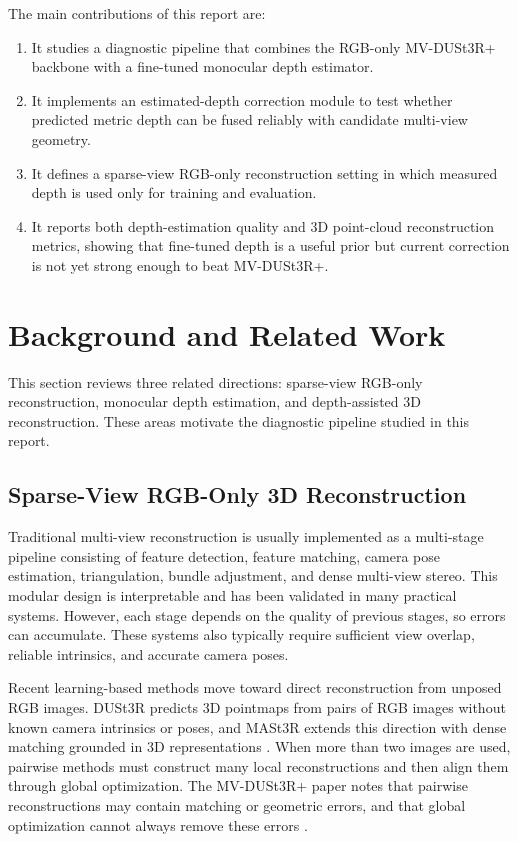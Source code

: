 \documentclass[12pt,a4paper]{article}
\newcommand{\mvdp}{MV-DUSt3R+}
\begin{document}
The main contributions of this report are:
\begin{enumerate}[leftmargin=1.2cm]
    \item It studies a diagnostic pipeline that combines the RGB-only \mvdp{} backbone with a fine-tuned monocular depth estimator.
    \item It implements an estimated-depth correction module to test whether predicted metric depth can be fused reliably with candidate multi-view geometry.
    \item It defines a sparse-view RGB-only reconstruction setting in which measured depth is used only for training and evaluation.
    \item It reports both depth-estimation quality and 3D point-cloud reconstruction metrics, showing that fine-tuned depth is a useful prior but current correction is not yet strong enough to beat \mvdp{}.
\end{enumerate}

\section{Background and Related Work}
This section reviews three related directions: sparse-view RGB-only reconstruction, monocular depth estimation, and depth-assisted 3D reconstruction. These areas motivate the diagnostic pipeline studied in this report.

\subsection{Sparse-View RGB-Only 3D Reconstruction}
Traditional multi-view reconstruction is usually implemented as a multi-stage pipeline consisting of feature detection, feature matching, camera pose estimation, triangulation, bundle adjustment, and dense multi-view stereo. This modular design is interpretable and has been validated in many practical systems. However, each stage depends on the quality of previous stages, so errors can accumulate. These systems also typically require sufficient view overlap, reliable intrinsics, and accurate camera poses.

Recent learning-based methods move toward direct reconstruction from unposed RGB images. DUSt3R predicts 3D pointmaps from pairs of RGB images without known camera intrinsics or poses, and MASt3R extends this direction with dense matching grounded in 3D representations \cite{dust3r_paper,mast3r_paper}. When more than two images are used, pairwise methods must construct many local reconstructions and then align them through global optimization. The \mvdp{} paper notes that pairwise reconstructions may contain matching or geometric errors, and that global optimization cannot always remove these errors \cite{mvdust3r_paper}.
\end{document}
